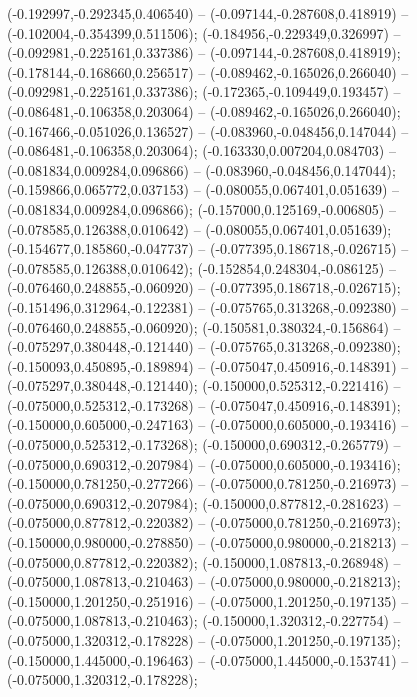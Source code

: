 (-0.192997,-0.292345,0.406540) -- (-0.097144,-0.287608,0.418919) -- (-0.102004,-0.354399,0.511506);
 (-0.184956,-0.229349,0.326997) -- (-0.092981,-0.225161,0.337386) -- (-0.097144,-0.287608,0.418919);
 (-0.178144,-0.168660,0.256517) -- (-0.089462,-0.165026,0.266040) -- (-0.092981,-0.225161,0.337386);
 (-0.172365,-0.109449,0.193457) -- (-0.086481,-0.106358,0.203064) -- (-0.089462,-0.165026,0.266040);
 (-0.167466,-0.051026,0.136527) -- (-0.083960,-0.048456,0.147044) -- (-0.086481,-0.106358,0.203064);
 (-0.163330,0.007204,0.084703) -- (-0.081834,0.009284,0.096866) -- (-0.083960,-0.048456,0.147044);
 (-0.159866,0.065772,0.037153) -- (-0.080055,0.067401,0.051639) -- (-0.081834,0.009284,0.096866);
 (-0.157000,0.125169,-0.006805) -- (-0.078585,0.126388,0.010642) -- (-0.080055,0.067401,0.051639);
 (-0.154677,0.185860,-0.047737) -- (-0.077395,0.186718,-0.026715) -- (-0.078585,0.126388,0.010642);
 (-0.152854,0.248304,-0.086125) -- (-0.076460,0.248855,-0.060920) -- (-0.077395,0.186718,-0.026715);
 (-0.151496,0.312964,-0.122381) -- (-0.075765,0.313268,-0.092380) -- (-0.076460,0.248855,-0.060920);
 (-0.150581,0.380324,-0.156864) -- (-0.075297,0.380448,-0.121440) -- (-0.075765,0.313268,-0.092380);
 (-0.150093,0.450895,-0.189894) -- (-0.075047,0.450916,-0.148391) -- (-0.075297,0.380448,-0.121440);
 (-0.150000,0.525312,-0.221416) -- (-0.075000,0.525312,-0.173268) -- (-0.075047,0.450916,-0.148391);
 (-0.150000,0.605000,-0.247163) -- (-0.075000,0.605000,-0.193416) -- (-0.075000,0.525312,-0.173268);
 (-0.150000,0.690312,-0.265779) -- (-0.075000,0.690312,-0.207984) -- (-0.075000,0.605000,-0.193416);
 (-0.150000,0.781250,-0.277266) -- (-0.075000,0.781250,-0.216973) -- (-0.075000,0.690312,-0.207984);
 (-0.150000,0.877812,-0.281623) -- (-0.075000,0.877812,-0.220382) -- (-0.075000,0.781250,-0.216973);
 (-0.150000,0.980000,-0.278850) -- (-0.075000,0.980000,-0.218213) -- (-0.075000,0.877812,-0.220382);
 (-0.150000,1.087813,-0.268948) -- (-0.075000,1.087813,-0.210463) -- (-0.075000,0.980000,-0.218213);
 (-0.150000,1.201250,-0.251916) -- (-0.075000,1.201250,-0.197135) -- (-0.075000,1.087813,-0.210463);
 (-0.150000,1.320312,-0.227754) -- (-0.075000,1.320312,-0.178228) -- (-0.075000,1.201250,-0.197135);
 (-0.150000,1.445000,-0.196463) -- (-0.075000,1.445000,-0.153741) -- (-0.075000,1.320312,-0.178228);

